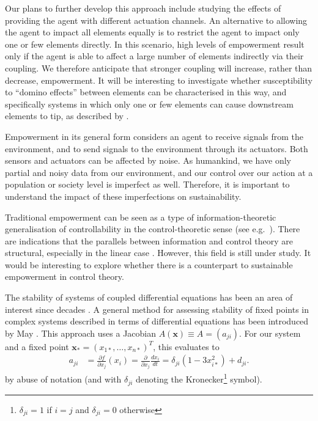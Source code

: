 \documentclass[conference]{IEEEtran}
\newcommand{\vectorsym}[1]{\ensuremath{\mathbf{#1}}}
\begin{document}
Our plans to further develop this approach include studying the
effects of providing the agent with different actuation channels. An
alternative to allowing the agent to impact all elements equally is to
restrict the agent to impact only one or few elements directly. In
this scenario, high levels of empowerment result only if the agent is
able to affect a large number of elements indirectly via their
coupling. We therefore anticipate that stronger coupling will
increase, rather than decrease, empowerment. It will be interesting to
investigate whether susceptibility to ``domino effects'' between
elements can be characterised in this way, and specifically systems in
which only one or few elements can cause  downstream elements to tip, as
described by \cite{Brummitt2015_coupledcatastrophes}.

Empowerment in its general form considers an agent to receive signals
from the environment, and to send signals to the environment through
its actuators. Both sensors and actuators can be affected by noise. As
humankind, we have only partial and noisy data from our environment,
and our control over our action at a population or society level is
imperfect as well. Therefore, it is important to understand the impact
of these imperfections on sustainability.

Traditional empowerment can be seen as a type of information-theoretic
generalisation of controllability in the control-theoretic sense (see
e.g.\ \cite{Tiomkin2017_controlcapacity}). There are indications that
the parallels between information and control theory are structural,
especially in the linear case \cite{Tanaka2018_mindirinfolqgcontrol}.
However, this field is still under study. It would be interesting to
explore whether there is a counterpart to sustainable empowerment in
control theory.

The stability of systems of coupled differential equations has been an
area of interest since decades \cite{Landi2018_ecologicalnetworks}. A
general method for assessing stability of fixed points in complex
systems described in terms of differential equations has been
introduced by May \cite{May1972_stablelargecomplexsystem}. This
approach uses a Jacobian $A(\vectorsym{x}) \equiv A = (a_{ji})$. For
our system and a fixed point
$\vectorsym{x}_* = (x_{1*}, \ldots, x_{n*})^T$, this evaluates to
\begin{align*}
  a_{ji} &= \frac{\partial f}{\partial x_j}(x_i) = \frac{\partial}{\partial x_j}\frac{d x_i}{d t} = \delta_{ji} (1 - 3 x_{i*}^2) + d_{ji}.
\end{align*}
by abuse of notation (and with $\delta_{ji}$ denoting the
Kronecker\footnote{$\delta_{ji}=1$ if $i=j$ and $\delta_{ji}=0$
  otherwise} symbol).
\end{document}
